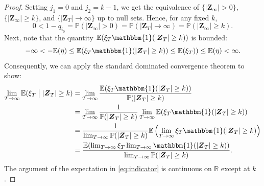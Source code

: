 \documentclass[preprint,3p,12pt]{elsarticle}
\theoremstyle{definition}
\begin{document}
\begin{proof}
Setting $j_1 = 0$ and $j_2 = k-1$, we get the equivalence of $\{|\boldsymbol{Z}_{\infty}| > 0\}$, $\{|\boldsymbol{Z}_{\infty}| \ge k\}$, and $\{|\boldsymbol{Z}_T| \rightarrow \infty\}$ up to null sets. %
Hence, for any fixed $k$,
\begin{equation*}
    0 < 1- q_{i_0} = \mathbb{P}(|\boldsymbol{Z}_{\infty}| > 0) = \mathbb{P}(|\boldsymbol{Z}_T| \rightarrow \infty) = \mathbb{P}(|\boldsymbol{Z}_{\infty}| \ge k).
\end{equation*}
Next, note that the quantity $\mathbb{E}(\xi_{T} \mathbbm{1}(|\boldsymbol{Z}_T| \ge k))$ is bounded:
\begin{equation*}
   -\infty < -\mathbb{E}(\eta) \le  \mathbb{E}(\xi_{T} \mathbbm{1}(|\boldsymbol{Z}_T| \ge k)) \le \mathbb{E}(\xi_{T} )) \le \mathbb{E}(\eta) < \infty.
\end{equation*}
Consequently, we can apply the standard dominated convergence theorem to show: %
\begin{align}
        \lim_{T \rightarrow \infty} \mathbb{E}(\xi_{T} \bigm| |\boldsymbol{Z}_T| \ge k)
&= \lim_{T \rightarrow \infty} \frac{\mathbb{E}(\xi_{T} \mathbbm{1}(|\boldsymbol{Z}_T| \ge k)) }{\mathbb{P}(|\boldsymbol{Z}_T| \ge k)} \nonumber\\
    &= \lim_{T \rightarrow \infty} \frac{1}{\mathbb{P}(|\boldsymbol{Z}_T| \ge k)} \lim_{T \rightarrow \infty} \mathbb{E}(\xi_{T} \mathbbm{1}(|\boldsymbol{Z}_T| \ge k)) \nonumber\\
    & = \frac{1}{\lim_{T \rightarrow \infty}\mathbb{P}(|\boldsymbol{Z}_{T}| \ge k)}  \mathbb{E}\left(\lim_{T \rightarrow \infty}\xi_{T} \mathbbm{1}(|\boldsymbol{Z}_T| \ge k)\right) \nonumber\\ %
    &= \frac{\mathbb{E}(\lim_{T \rightarrow \infty}\xi_{T} \lim_{T \rightarrow \infty}\mathbbm{1}(|\boldsymbol{Z}_T| \ge k))}{\lim_{T \rightarrow \infty}\mathbb{P}(|\boldsymbol{Z}_{T}| \ge k)}.   \label{eq:indicator}
\end{align}
The argument of the expectation in \eqref{eq:indicator} is continuous on $\mathbb{R}$ except at $k$. 


\end{proof}
\end{document}
